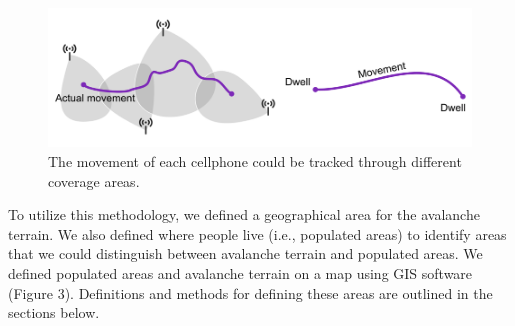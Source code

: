 \documentclass[authordate,empirical, issue]{jote-new-article}
\begin{document}
\begin{figure}[h]
  \begin{fullwidth}


    \includegraphics[width=\linewidth]{media/image2.png}
    \caption{The movement of each cellphone could be tracked through different coverage areas.}
    \label{fig:rId9}

  \end{fullwidth}
\end{figure}






To utilize this methodology, we defined a geographical area for the avalanche terrain. We also defined where people live (i.e., populated areas) to identify areas that we could distinguish between avalanche terrain and populated areas. We defined populated areas and avalanche terrain on a map using GIS software (Figure 3). Definitions and methods for defining these areas are outlined in the sections below.
\end{document}
